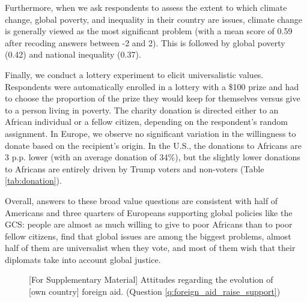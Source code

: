 \begin{tcolorbox}
Furthermore, when we ask respondents to assess the extent to which climate change, global poverty, and inequality in their country are issues, climate change is generally viewed as the most significant problem (with a mean score of 0.59 after recoding answers between -2 and 2). This is followed by global poverty (0.42) and national inequality (0.37). %

Finally, we conduct a lottery experiment to elicit universalistic values. Respondents were automatically enrolled in a lottery with a \$100 prize and had to choose the proportion of the prize they would keep for themselves versus give to a person living in poverty. The charity donation is directed either to an African individual or a fellow citizen, depending on the respondent's random assignment. In Europe, we observe no significant variation in the willingness to donate based on the recipient's origin. In the U.S., the donations to Africans are 3 p.p. lower (with an average donation of 34\%), but the slightly lower donations to Africans are entirely driven by Trump voters and non-voters (Table \ref{tab:donation}).

Overall, answers to these broad value questions are consistent with half of Americans and three quarters of Europeans supporting global policies like the GCS: people are almost as much willing to give to poor Africans than to poor fellow citizens, find that global issues are among the biggest problems, almost half of them are universalist when they vote, and most of them wish that their diplomats take into account global justice.
\end{tcolorbox}

\begin{figure}[h!]
  \caption[Attitudes on the evolution of foreign aid]{[For Supplementary Material] Attitudes regarding the evolution of [own country] foreign aid. (Question \ref{q:foreign_aid_raise_support})}\label{fig:foreign_aid_raise_support}
\end{figure}

